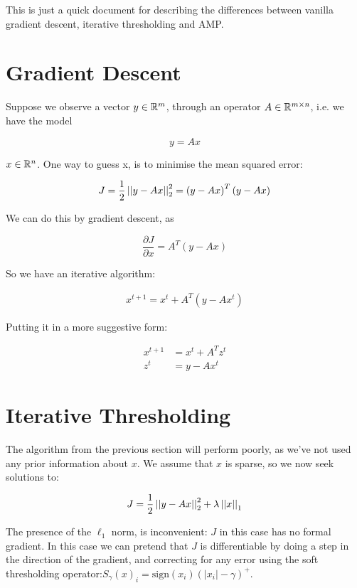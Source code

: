 \documentclass{article}
\begin{document}
This is just a quick document for describing the differences between vanilla gradient descent, iterative thresholding and AMP.

\section{Gradient Descent}
Suppose we observe a vector \(y \in {\mathbb{R}}^m\), through an operator \(A \in {\mathbb{R}}^{m \times n}\), i.e. we have the model

\begin{equation}
y = Ax
\end{equation}

\(x \in {\mathbb{R}}^{n}\). One way to guess x, is to minimise the mean squared error:

\begin{equation}
J = \frac{1}{2}\left|\left|y-Ax\right|\right|_2^2 = \left(y-Ax\right)^T\left(y-Ax\right)
\end{equation}

We can do this by gradient descent, as 

\begin{equation}
\frac{\partial J}{\partial x} = A^T(y-Ax)
\end{equation}

So we have an iterative algorithm:

\begin{align*}
x^{t+1} = x^t + A^T(y-Ax^t)
\end{align*}

Putting it in a more suggestive form:

\begin{align*}
x^{t+1} &= x^t + A^Tz^t \\
z^t &= y - Ax^t
\end{align*}

\section{Iterative Thresholding}
The algorithm from the previous section will perform poorly, as we've not used any prior information about \(x\). We assume that \(x\) is sparse, so we now seek solutions to:

\begin{equation}
J = \frac{1}{2}\left|\left|y-Ax\right|\right|_2^2 + \lambda\left|\left|x\right|\right|_1
\end{equation}

The presence of the \(\ell_1\) norm, is inconvenient: \(J\) in this case has no formal gradient. In this case we can pretend that \(J\) is differentiable by doing a step in the direction of the gradient, and correcting for any error using the soft thresholding operator:\(S_\gamma\left(x\right)_i = \mathrm{sign}(x_i)\left(|x_i| - \gamma\right)^+\).
\end{document}

